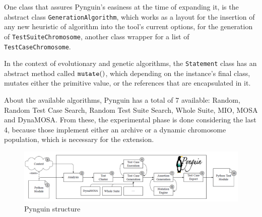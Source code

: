 \documentclass[%
  chapterprefix=false,%
  open=right,%
  twoside=true,%
  paper=a4,%
  logofile={Figures/logo.png},%
  thesistype=master,%
  UKenglish,%
]{se2thesis}
\newcommand{\classname}[1]{\texttt{#1}}
\newcommand{\callable}[2][]{\(\text{\texttt{#2}}(#1)\)}
\begin{document}
One class that assures Pynguin's easiness at the time of expanding it, is the abstract class \classname{GenerationAlgorithm}, which works as a layout for the insertion of any new heuristic of algorithm into the tool's current options, for the generation of \classname{TestSuiteChromosome}, another class wrapper for a list of \classname{TestCaseChromosome}.

In the context of evolutionary and genetic algorithms, the \classname{Statement} class has an abstract method called \callable{mutate}, which depending on the instance's final class, mutates either the primitive value, or the references that are encapsulated in it.

About the available algorithms, Pynguin has a total of 7 available: Random, Random Test Case Search, Random Test Suite Search, Whole Suite, MIO, MOSA and DynaMOSA.\@
From these, the experimental phase is done considering the last 4, because those implement either an archive or a dynamic chromosome population, which is necessary for the extension.

\begin{figure}[tb]
  \centering
  \includegraphics[width=.99\textwidth]{Figures/pynguin.png}
  \caption{Pynguin structure}\label{fig:pyn}
\end{figure}
\end{document}
